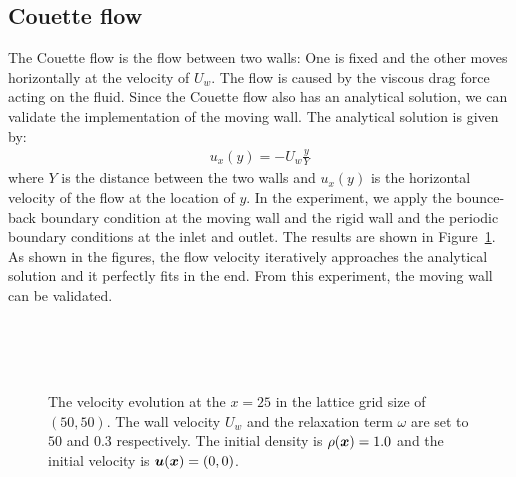\subsection{Couette flow}
The Couette flow is the flow between two walls:
One is fixed and the other moves horizontally at the velocity of $U_w$.
The flow is caused by the viscous drag force acting on the fluid.
Since the Couette flow also has an analytical solution,
we can validate the implementation of the moving wall.
The analytical solution is given by:
\begin{equation}
\begin{aligned}
  u_x(y) = - U_w \frac{y}{Y}
\end{aligned}
\end{equation}
where $Y$ is the distance between the two walls
and $u_x(y)$ is the horizontal velocity of the flow
at the location of $y$. 
In the experiment, we apply the bounce-back boundary condition
at the moving wall and the rigid wall
and the periodic boundary conditions at the inlet and outlet.
The results are shown in Figure~\ref{fig:couette-velocity-evolution}.
As shown in the figures, the flow velocity iteratively approaches
the analytical solution and it perfectly fits in the end.
From this experiment, the moving wall can be validated.

\begin{figure}[tb]
  \begin{center}
    \\
    \\
    \\
    \caption{The velocity evolution at
      the $x = 25$ in the lattice grid size of $(50, 50)$.
      The wall velocity $U_w$ and the relaxation term $\omega$ are set
      to $50$ and $0.3$ respectively.
      The initial density is $\rho(\boldsymbol{x}) = 1.0$ and the initial velocity is $\boldsymbol{u}(\boldsymbol{x}) = (0, 0)$. 
      \label{fig:couette-velocity-evolution}}
  \end{center}
\end{figure}

